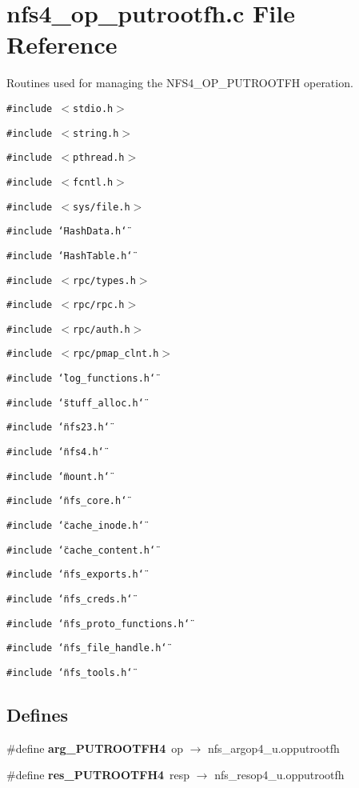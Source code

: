 \section{nfs4\_\-op\_\-putrootfh.c File Reference}
\label{nfs4__op__putrootfh_8c}
Routines used for managing the NFS4\_\-OP\_\-PUTROOTFH operation. 

{\tt \#include $<$stdio.h$>$}\par
{\tt \#include $<$string.h$>$}\par
{\tt \#include $<$pthread.h$>$}\par
{\tt \#include $<$fcntl.h$>$}\par
{\tt \#include $<$sys/file.h$>$}\par
{\tt \#include \char`\"{}Hash\-Data.h\char`\"{}}\par
{\tt \#include \char`\"{}Hash\-Table.h\char`\"{}}\par
{\tt \#include $<$rpc/types.h$>$}\par
{\tt \#include $<$rpc/rpc.h$>$}\par
{\tt \#include $<$rpc/auth.h$>$}\par
{\tt \#include $<$rpc/pmap\_\-clnt.h$>$}\par
{\tt \#include \char`\"{}log\_\-functions.h\char`\"{}}\par
{\tt \#include \char`\"{}stuff\_\-alloc.h\char`\"{}}\par
{\tt \#include \char`\"{}nfs23.h\char`\"{}}\par
{\tt \#include \char`\"{}nfs4.h\char`\"{}}\par
{\tt \#include \char`\"{}mount.h\char`\"{}}\par
{\tt \#include \char`\"{}nfs\_\-core.h\char`\"{}}\par
{\tt \#include \char`\"{}cache\_\-inode.h\char`\"{}}\par
{\tt \#include \char`\"{}cache\_\-content.h\char`\"{}}\par
{\tt \#include \char`\"{}nfs\_\-exports.h\char`\"{}}\par
{\tt \#include \char`\"{}nfs\_\-creds.h\char`\"{}}\par
{\tt \#include \char`\"{}nfs\_\-proto\_\-functions.h\char`\"{}}\par
{\tt \#include \char`\"{}nfs\_\-file\_\-handle.h\char`\"{}}\par
{\tt \#include \char`\"{}nfs\_\-tools.h\char`\"{}}\par
\subsection*{Defines}
\begin{CompactItemize}
\item 
\#define {\bf arg\_\-PUTROOTFH4}\ op $\rightarrow$ nfs\_\-argop4\_\-u.opputrootfh
\item 
\#define {\bf res\_\-PUTROOTFH4}\ resp $\rightarrow$ nfs\_\-resop4\_\-u.opputrootfh
\end{CompactItemize}
